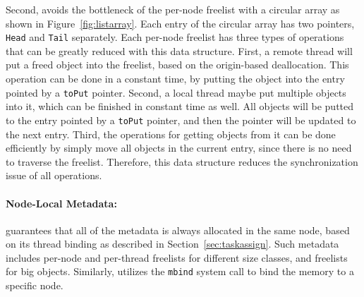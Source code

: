 Second, \NM{} avoids the bottleneck of the per-node freelist with a circular array as shown in Figure~\ref{fig:listarray}. Each entry of the circular array has two pointers, \texttt{Head} and \texttt{Tail} separately. Each per-node freelist has three types of operations that can be greatly reduced with this data structure. First, a remote thread will put a freed object into the freelist, based on the origin-based deallocation. This operation can be done in a constant time, by putting the object into the entry pointed by a \texttt{toPut} pointer. Second, a local thread maybe put multiple objects into it, which can be finished in constant time as well. All objects will be putted to the entry pointed by a \texttt{toPut} pointer, and then the pointer will be updated to the next entry. Third, the operations for getting objects from it can be done efficiently by simply move all objects in the current entry, since there is no need to traverse the freelist. Therefore, this data structure reduces the synchronization issue of all operations. 

\paragraph{Node-Local Metadata:} \NM{} guarantees that all of the metadata is always allocated in the same node, based on its thread binding as described in Section~\ref{sec:taskassign}. Such metadata includes per-node and per-thread freelists for different size classes, and freelists for big objects. Similarly, \NM{} utilizes the \texttt{mbind} system call to bind the memory to a specific node.  

